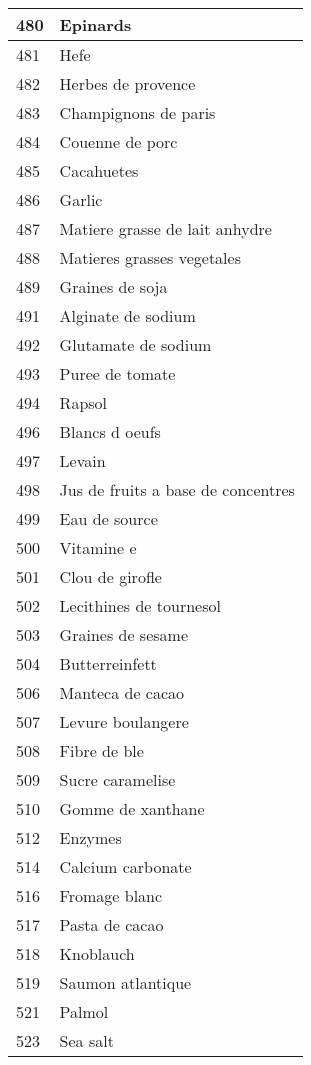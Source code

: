 \begin{longtable}{|l|l|}
480 & Epinards \\ \hline 
481 & Hefe \\ \hline 
482 & Herbes de provence \\ \hline 
483 & Champignons de paris \\ \hline 
484 & Couenne de porc \\ \hline 
485 & Cacahuetes \\ \hline 
486 & Garlic \\ \hline 
487 & Matiere grasse de lait anhydre \\ \hline 
488 & Matieres grasses vegetales \\ \hline 
489 & Graines de soja \\ \hline 
491 & Alginate de sodium \\ \hline 
492 & Glutamate de sodium \\ \hline 
493 & Puree de tomate \\ \hline 
494 & Rapsol \\ \hline 
496 & Blancs d oeufs \\ \hline 
497 & Levain \\ \hline 
498 & Jus de fruits a base de concentres \\ \hline 
499 & Eau de source \\ \hline 
500 & Vitamine e \\ \hline 
501 & Clou de girofle \\ \hline 
502 & Lecithines de tournesol \\ \hline 
503 & Graines de sesame \\ \hline 
504 & Butterreinfett \\ \hline 
506 & Manteca de cacao \\ \hline 
507 & Levure boulangere \\ \hline 
508 & Fibre de ble \\ \hline 
509 & Sucre caramelise \\ \hline 
510 & Gomme de xanthane \\ \hline 
512 & Enzymes \\ \hline 
514 & Calcium carbonate \\ \hline 
516 & Fromage blanc \\ \hline 
517 & Pasta de cacao \\ \hline 
518 & Knoblauch \\ \hline 
519 & Saumon atlantique \\ \hline 
521 & Palmol \\ \hline 
523 & Sea salt \\ \hline 

\end{longtable}
